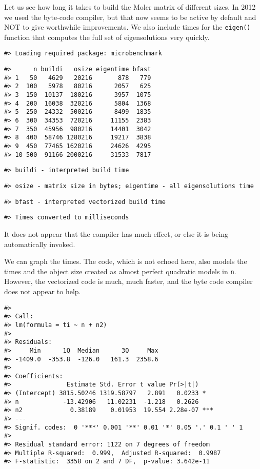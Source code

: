 Let us see how long it takes to build the Moler matrix of different sizes.
In 2012 we used the byte-code compiler, but that now seems to be active by
default and NOT to give worthwhile improvements.
We also include times for the \texttt{eigen()} function that computes
the full set of eigensolutions very quickly.

\begin{verbatim}
#> Loading required package: microbenchmark
\end{verbatim}

\begin{verbatim}
#>      n buildi   osize eigentime bfast
#> 1   50   4629   20216       878   779
#> 2  100   5978   80216      2057   625
#> 3  150  10137  180216      3957  1075
#> 4  200  16038  320216      5804  1368
#> 5  250  24332  500216      8499  1835
#> 6  300  34353  720216     11155  2383
#> 7  350  45956  980216     14401  3042
#> 8  400  58746 1280216     19217  3838
#> 9  450  77465 1620216     24626  4295
#> 10 500  91166 2000216     31533  7817
\end{verbatim}

\begin{verbatim}
#> buildi - interpreted build time
\end{verbatim}

\begin{verbatim}
#> osize - matrix size in bytes; eigentime - all eigensolutions time
\end{verbatim}

\begin{verbatim}
#> bfast - interpreted vectorized build time
\end{verbatim}

\begin{verbatim}
#> Times converted to milliseconds
\end{verbatim}

It does not appear that the compiler has much effect, or else it is being automatically invoked.

We can graph the times. The code, which is not
echoed here, also models the times and the object size
created as almost perfect quadratic models in \texttt{n}. However,
the vectorized code is much, much faster, and the byte code
compiler does not appear to help.

\begin{verbatim}
#> 
#> Call:
#> lm(formula = ti ~ n + n2)
#> 
#> Residuals:
#>     Min      1Q  Median      3Q     Max 
#> -1409.0  -353.8  -126.0   161.3  2358.6 
#> 
#> Coefficients:
#>               Estimate Std. Error t value Pr(>|t|)    
#> (Intercept) 3815.50246 1319.58797   2.891   0.0233 *  
#> n            -13.42906   11.02231  -1.218   0.2626    
#> n2             0.38189    0.01953  19.554 2.28e-07 ***
#> ---
#> Signif. codes:  0 '***' 0.001 '**' 0.01 '*' 0.05 '.' 0.1 ' ' 1
#> 
#> Residual standard error: 1122 on 7 degrees of freedom
#> Multiple R-squared:  0.999,  Adjusted R-squared:  0.9987 
#> F-statistic:  3358 on 2 and 7 DF,  p-value: 3.642e-11
\end{verbatim}

